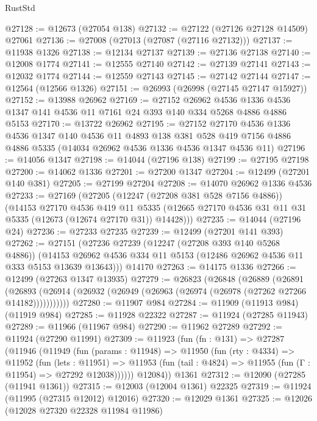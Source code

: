 \begin{lexlean}{RustStd}
\begin{coremodule}
@27128 := @12673 (@27054 @138)
@27132 := @27122 (@27126 @27128 @14509) @27061
@27136 := @27008 (@27013 (@27087 (@27116 @27132)))
@27137 := @11938 @1326
@27138 := @12134 @27137
@27139 := @27136 @27138
@27140 := @12008 @1774
@27141 := @12555 @27140
@27142 := @27139 @27141
@27143 := @12032 @1774
@27144 := @12559 @27143
@27145 := @27142 @27144
@27147 := @12564 (@12566 @1326)
@27151 := @26993 (@26998 (@27145 @27147 @15927))
@27152 := @13988 @26962
@27169 := @27152
    @26962
    @4536
    @1336
    @4536
    @1347
    @141
    @4536
    @11
    @7161
    @24
    @393
    @140
    @334
    @5268
    @4886
    @4886
    @5153
@27170 := @13722 @26962
@27195 := @27152
    @27170
    @4536
    @1336
    @4536
    @1347
    @140
    @4536
    @11
    @4893
    @138
    @381
    @528
    @419
    @7156
    @4886
    @4886
    @5335
    (@14034 @26962 @4536 @1336 @4536 @1347 @4536 @11)
@27196 := @14056 @1347
@27198 := @14044 (@27196 @138)
@27199 := @27195 @27198
@27200 := @14062 @1336
@27201 := @27200 @1347
@27204 := @12499 (@27201 @140 @381)
@27205 := @27199 @27204
@27208 := @14070 @26962 @1336 @4536
@27233 := @27169
    (@27205
      (@12247 (@27208 @381 @528 @7156 @4886))
      (@14153
        @27170
        @4536
        @419
        @11
        @5335
        (@12665 @27170 @4536 @31 @11 @31 @5335 (@12673 (@12674 @27170 @31)) @14428)))
@27235 := @14044 (@27196 @24)
@27236 := @27233 @27235
@27239 := @12499 (@27201 @141 @393)
@27262 := @27151
    (@27236
      @27239
      (@12247 (@27208 @393 @140 @5268 @4886))
      (@14153 @26962 @4536 @334 @11 @5153 (@12486 @26962 @4536 @11 @333 @5153 @13639 @13643)))
    @14170
@27263 := @14175 @1336
@27266 := @12499 (@27263 @1347 @13935)
@27279 := @26823
    (@26848
      (@26889
        (@26891
          (@26893 (@26914 (@26932 (@26949 (@26963 (@26974 (@26978 (@27262 @27266 @14182)))))))))))
@27280 := @11907 @984
@27284 := @11909 (@11913 @984) (@11919 @984)
@27285 := @11928 @22322
@27287 := @11924 (@27285 @11943)
@27289 := @11966 (@11967 @984)
@27290 := @11962 @27289
@27292 := @11924 (@27290 @11991)
@27309 := @11923
    (fun (fn : @131) =>
    @27287
      (@11946
        (@11949
          (fun (params : @11948) =>
          @11950
            (fun (rty : @4334) =>
            @11952
              (fun (lets : @11951) =>
              @11953 (fun (tail : @4824) => @11955 (fun (Γ : @11954) => @27292 @12038))))))
        @12084))
    @1361
@27312 := @12090 (@27285 (@11941 @1361))
@27315 := @12003 (@12004 @1361) @22325
@27319 := @11924 (@11995 (@27315 @12012) @12016)
@27320 := @12029 @1361
@27325 := @12026 (@12028 @27320 @22328 @11984 @11986)

\end{coremodule}
\end{lexlean}
